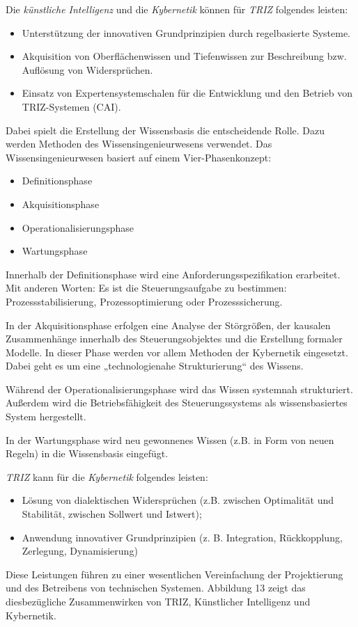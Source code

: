\documentclass[11pt,a4paper]{article}
\begin{document}
Die \emph{künstliche Intelligenz} und die \emph{Kybernetik} können für
\emph{TRIZ} folgendes leisten:
\begin{itemize}
\item Unterstützung der innovativen Grundprinzipien durch regelbasierte
  Systeme. 
\item Akquisition von Oberflächenwissen und Tiefenwissen zur Beschreibung
bzw. Auflösung von Widersprüchen.
\item Einsatz von Expertensystemschalen für die Entwicklung und den Betrieb von
  TRIZ-Systemen (CAI).
\end{itemize}
Dabei spielt die Erstellung der Wissensbasis die entscheidende Rolle. Dazu
werden Methoden des Wissensingenieurwesens verwendet. Das Wissensingenieurwesen
basiert auf einem Vier-Phasenkonzept:
\begin{itemize}
\item Definitionsphase
\item Akquisitionsphase
\item Operationalisierungsphase
\item Wartungsphase
\end{itemize}
Innerhalb der Definitionsphase wird eine Anforderungsspezifikation erarbeitet.
Mit anderen Worten: Es ist die Steuerungsaufgabe zu bestimmen:
Prozessstabilisierung, Prozessoptimierung oder Prozesssicherung.

In der Akquisitionsphase erfolgen eine Analyse der Störgrößen, der kausalen
Zusammenhänge innerhalb des Steuerungsobjektes und die Erstellung formaler
Modelle. In dieser Phase werden vor allem Methoden der Kybernetik eingesetzt.
Dabei geht es um eine „technologienahe Strukturierung“ des Wissens.

Während der Operationalisierungsphase wird das Wissen systemnah strukturiert.
Außerdem wird die Betriebsfähigkeit des Steuerungssystems als wissensbasiertes
System hergestellt.

In der Wartungsphase wird neu gewonnenes Wissen (z.B. in Form von neuen Regeln)
in die Wissensbasis eingefügt.

\emph{TRIZ} kann für die \emph{Kybernetik} folgendes leisten:
\begin{itemize}
\item Lösung von dialektischen Widersprüchen (z.B. zwischen Optimalität und
  Stabilität, zwischen Sollwert und Istwert);
\item Anwendung innovativer Grundprinzipien (z. B. Integration, Rückkopplung,
  Zerlegung, Dynamisierung)
\end{itemize}
Diese Leistungen führen zu einer wesentlichen Vereinfachung der Projektierung
und des Betreibens von technischen Systemen. Abbildung 13 zeigt das
diesbezügliche Zusammenwirken von TRIZ, Künstlicher Intelligenz und Kybernetik.
\end{document}
